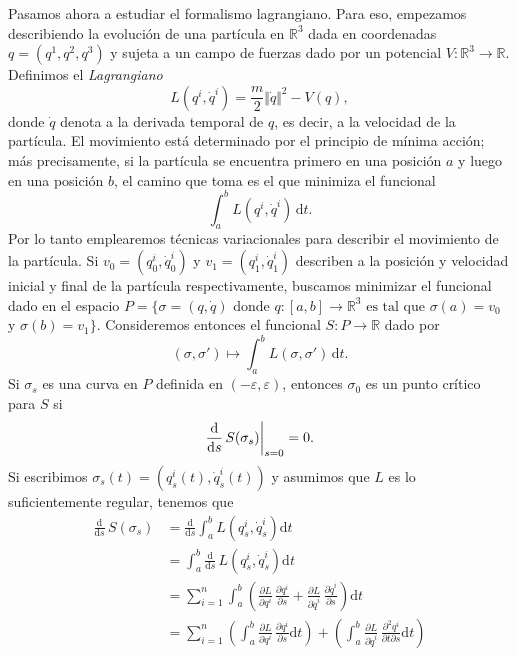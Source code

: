 \documentclass[11pt, a4paper]{article}
\newcommand{\RR}{\mathbb{R}}
\newcommand{\dd}{\mathrm{d}}
\newcommand{\dds}{\frac{\dd}{\dd s}}
\newcommand{\pardev}[2]{\frac{\partial #1}{\partial #2}}
\theoremstyle{plain}
\theoremstyle{definition}
\begin{document}
Pasamos ahora a estudiar el formalismo lagrangiano. Para eso, empezamos describiendo la evolución de una partícula en $\RR^3$ dada en coordenadas $q=(q^1,q^2,q^3)$ y sujeta a un campo de fuerzas dado por un potencial $V:\RR^3\to \RR$. Definimos el \emph{Lagrangiano}
\[L(q^i,\dot{q}^i) = \frac{m}{2}\Vert \dot{q}\Vert^2 -V(q),\]
donde $\dot{q}$ denota a la derivada temporal de $q$, es decir, a la velocidad de la partícula. El movimiento está determinado por el principio de mínima acción; más precisamente, si la partícula se encuentra primero en una posición $a$ y luego en una posición $b$, el camino que toma es el que minimiza el funcional \[\int_a^b L(q^i,\dot{q}^i)\,\dd t.\]
Por lo tanto emplearemos técnicas variacionales para describir el movimiento de la partícula. Si $v_0=(q_0^i,\dot{q}_0^i)$ y $v_1=(q_1^i, \dot{q}_1^i)$ describen a la posición y velocidad inicial y final de la partícula respectivamente, buscamos minimizar el funcional dado en el espacio $P=\{\sigma=(q,\dot{q})$ donde $q:[a,b]\to \RR^3 \text{ es tal que }\sigma(a)=v_0$ y $\sigma(b)=v_1\}$. Consideremos entonces el funcional $S:P\to \RR$ dado por
\[(\sigma, \sigma')\mapsto \int_a^b L(\sigma, \sigma')\,\dd t.\]
Si $\sigma_s$ es una curva en $P$ definida en $(-\varepsilon,\varepsilon)$, entonces $\sigma_0$ es un punto crítico para $S$ si
\[\dds\, S(\sigma_s)\bigg{|}_{s=0}=0.\]
Si escribimos $\sigma_s(t)=(q^i_s(t),\dot{q}^i_s(t))$ y asumimos que $L$ es lo suficientemente regular, tenemos que
\begin{align*}
\dds\,S(\sigma_s)&=\dds\int_a^b L(q^i_s,\dot{q}^i_s)\dd t\\
&= \int_a^b \dds \, L(q^i_s,\dot{q}^i_s)\dd t\\
&= \sum_{i=1}^n \int_a^b \left( \pardev{L}{q^i} \,\pardev{q^i}{s} + \pardev{L}{\dot{q}^i}\,\pardev{\dot{q}^i}{s} \right)\dd t\\
&= \sum_{i=1}^n \left( \int_a^b  \pardev{L}{q^i} \,\pardev{q^i}{s} \dd t\right)+ \left(\int_a^b \pardev{L}{\dot{q}^i}\,\frac{\partial^2 q^i}{\partial t\partial s}\dd t \right)
\end{align*}
\end{document}
